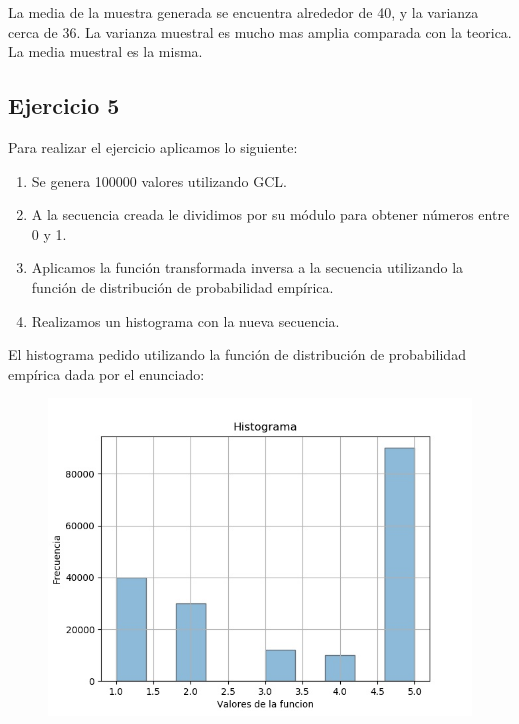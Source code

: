 \documentclass[11pt,a4paper]{article}
\begin{document}
	La media de la muestra generada se encuentra alrededor de 40, y la varianza cerca de 36.\newline
	La varianza muestral es mucho mas amplia comparada con la teorica. La media muestral es la misma.

	\subsection{Ejercicio 5}
	    Para realizar el ejercicio aplicamos lo siguiente:
	    \begin{enumerate}
	        \item Se genera 100000 valores utilizando GCL.
	        \item A la secuencia creada le dividimos por su módulo para obtener números entre 0 y 1.
	        \item Aplicamos la función transformada inversa a la secuencia utilizando la función de distribución de probabilidad empírica.
	        \item Realizamos un histograma con la nueva secuencia.
	    \end{enumerate}
	
		El histograma pedido utilizando la función de distribución de probabilidad empírica dada por el enunciado:
		\begin{figure}[H]
  			\centering
    			\includegraphics[width=14cm]{imagenes/histogramaEjer5}
		\end{figure}
\end{document}
